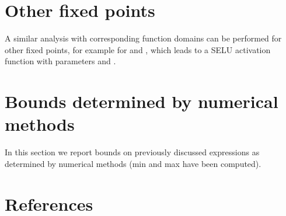 \documentclass{article}
\begin{document}
\clearpage

\section{Other fixed points}
A similar analysis with corresponding function domains can be performed for other fixed points, for example for  and , which leads
to a SELU activation function with parameters  and . 


\section{Bounds determined by numerical methods}

In this section we report bounds on previously discussed expressions as determined by numerical methods (min and max have been
computed). 






\section{References}
\label{sec:references}
 
 

\listoffigures
{}
\listoftables

\newpage
{}
\printindex 
\end{document}
